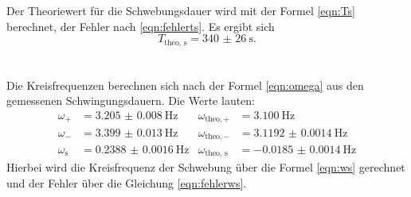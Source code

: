   \noindent Der Theoriewert für die Schwebungsdauer wird mit der Formel \eqref{eqn:Ts} berechnet, der Fehler nach \eqref{eqn:fehlerts}.
  Es ergibt sich
  \begin{equation*}
      T_ {\text{theo, s}} = \SI{340(26)}{\second}. 
  \end{equation*} \\ \\

  \noindent Die Kreisfrequenzen berechnen sich nach der Formel \eqref{eqn:omega} aus den gemessenen Schwingungsdauern. 
  Die Werte lauten: 
  \begin{align*}
      \omega_{+} &= \SI{3.205(8)}{\hertz} &         \omega_{\text{theo}, +} &= \SI{3.100}{\hertz}  \\
      \omega_{-} &= \SI{3.399(13)}{\hertz} &         \omega_{\text{theo}, -} &= \SI{3.1192(14)}{\hertz} \\
      \omega_{\text{s}} &= \SI{0.2388(16)}{\hertz} &  \omega_{\text{theo, s}} &= \SI{-0.0185(14)}{\hertz} 
  \end{align*}
  Hierbei wird die Kreisfrequenz der Schwebung über die Formel \eqref{eqn:ws} gerechnet und der Fehler über die Gleichung \eqref{eqn:fehlerws}. 